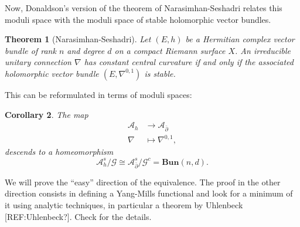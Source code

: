 \documentclass[12pt,a4paper]{book}
\newtheorem{thm}{Theorem}[section]
\newtheorem{corol}[thm]{Corollary}
\theoremstyle{definition} \newtheorem{defn}[thm]{Definition}
\theoremstyle{definition} \newtheorem{ejemplo}[thm]{Example}
\theoremstyle{remark} \newtheorem*{rem}{Remark}
\def\AA{\mathscr{A}}
\def\GG{\mathscr{G}}
\def\Bun{\mathbf{Bun}}
\def\delbar{\bar{\partial}}
\begin{document}
Now, Donaldson's version of the theorem of Narasimhan-Seshadri relates this moduli space with the moduli space of stable holomorphic vector bundles.

\begin{thm}[Narasimhan-Seshadri]
  Let $(E,h)$ be a Hermitian complex vector bundle of rank $n$ and degree $d$ on a compact Riemann surface $X$. An irreducible unitary connection $\nabla$ has constant central curvature if and only if the associated holomorphic vector bundle $(E,\nabla^{0,1})$ is stable.
\end{thm}
This can be reformulated in terms of moduli spaces:
\begin{corol}
  The map
  \begin{align*}
    \AA_h&\longrightarrow \AA_{\delbar}\\ 
     \nabla &\longmapsto \nabla^{0,1}, 
    \end{align*}
    descends to a homeomorphism
    \begin{equation*}
      \AA_h^s/\GG \cong \AA^s_{\delbar} /\GG^c = \Bun(n,d).
    \end{equation*}
\end{corol}
We will prove the ``easy'' direction of the equivalence. The proof in the other direction consists in defining a Yang-Mills functional and look for a minimum of it using analytic techniques, in particular a theorem by Uhlenbeck [REF:Uhlenbeck?]. Check \cite{donaldson} for the details.
\end{document}

